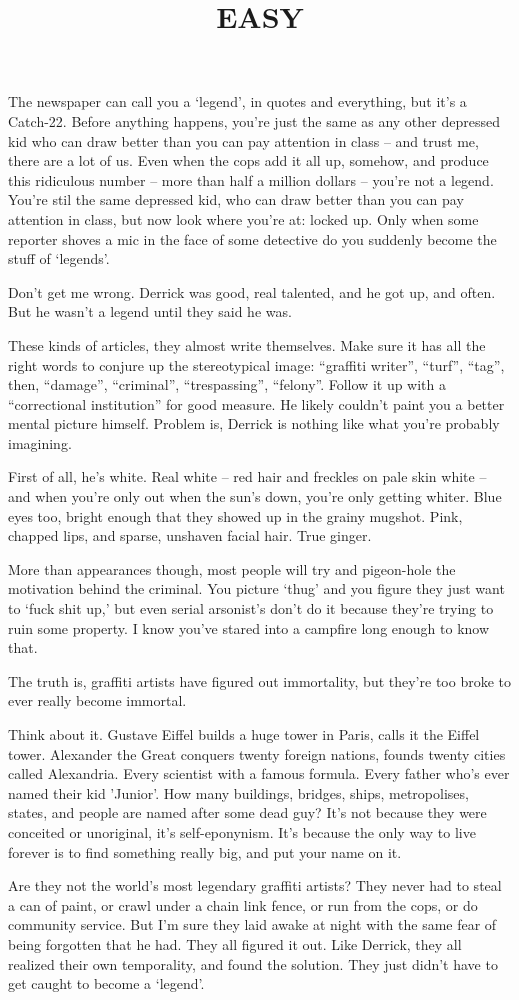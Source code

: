 \documentclass[]{article}
\title{EASY}
\date{}
\begin{document}
	\maketitle
	\thispagestyle{empty}
	\onehalfspacing
The newspaper can call you a `legend', in quotes and everything, but it's a Catch-22. Before anything happens, you're just the same as any other depressed kid who can draw better than you can pay attention in class -- and trust me, there are a lot of us. Even when the cops add it all up, somehow, and produce this ridiculous number -- more than half a million dollars -- you're not a legend. You're stil the same depressed kid, who can draw better than you can pay attention in class, but now look where you're at: locked up. Only when some reporter shoves a mic in the face of some detective do you suddenly become the stuff of `legends'.

Don't get me wrong. Derrick was good, real talented, and he got up, and often. But he wasn't a legend until they said he was.

These kinds of articles, they almost write themselves. Make sure it has all the right words to conjure up the stereotypical image: ``graffiti writer'', ``turf'', ``tag'', then, ``damage'', ``criminal'', ``trespassing'', ``felony''. Follow it up with a ``correctional institution'' for good measure. He likely couldn't paint you a better mental picture himself. Problem is, Derrick is nothing like what you're probably imagining. 

First of all, he's white. Real white -- red hair and freckles on pale skin white -- and when you're only out when the sun's down, you're only getting whiter. Blue eyes too, bright enough that they showed up in the grainy mugshot. Pink, chapped lips, and sparse, unshaven facial hair. True ginger.

More than appearances though, most people will try and pigeon-hole the motivation behind the criminal. You picture `thug' and you figure they just want to `fuck shit up,' but even serial arsonist's don't do it because they're trying to ruin some property. I know you've stared into a campfire long enough to know that.

The truth is, graffiti artists have figured out immortality, but they're too broke to ever really become immortal.

Think about it. Gustave Eiffel builds a huge tower in Paris, calls it the Eiffel tower. Alexander the Great conquers twenty foreign nations, founds twenty cities called Alexandria. Every scientist with a famous formula. Every father who's ever named their kid 'Junior'. How many buildings, bridges, ships, metropolises, states, and people are named after some dead guy? It's not because they were conceited or unoriginal, it's self-eponynism. It's because the only way to live forever is to find something really big, and put your name on it.

Are they not the world's most legendary graffiti artists? They never had to steal a can of paint, or crawl under a chain link fence, or run from the cops, or do community service. But I'm sure they laid awake at night with the same fear of being forgotten that he had. They all figured it out. Like Derrick, they all realized their own temporality, and found the solution. They just didn't have to get caught to become a `legend'.
\end{document}

